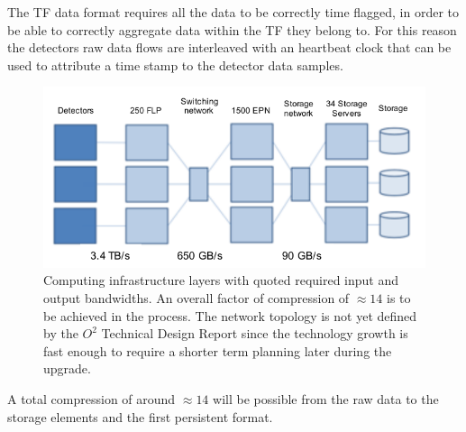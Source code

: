 The TF data format requires all the data to be correctly time flagged, in order to be able to correctly aggregate data within the TF they belong to.
For this reason the detectors raw data flows are interleaved with an heartbeat clock that can be used to attribute a time stamp to the detector data samples.


\begin{figure}[!ht]
\begin{center}
\includegraphics[width=0.75\linewidth]{Chapters/O2/Figs/Compression_2.pdf}
\caption{Computing infrastructure layers with quoted required input and output bandwidths. An overall factor of compression of $\approx14$ is to be achieved in the process. The network topology is not yet defined by the $O^2$ Technical Design Report since the technology growth is fast enough to require a shorter term planning later during the upgrade.}
\label{fig:O2_Compression}
\end{center}
\end{figure}

A total compression of around $\approx14$ \cite{o2compression} will be possible from the raw data to the storage elements and the first persistent format.

